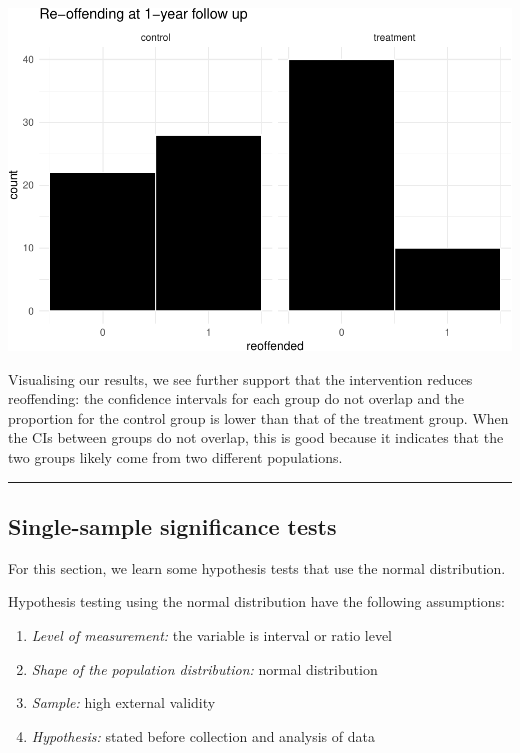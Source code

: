 \documentclass[
]{book}
\begin{document}
\includegraphics{06-hypotheses_files/figure-latex/unnamed-chunk-6-1.pdf}

Visualising our results, we see further support that the intervention reduces reoffending: the confidence intervals for each group do not overlap and the proportion for the control group is lower than that of the treatment group. When the CIs between groups do not overlap, this is good because it indicates that the two groups likely come from two different populations.

\begin{center}\rule{0.5\linewidth}{0.5pt}\end{center}

\hypertarget{single-sample-significance-tests}{%
\subsection{Single-sample significance tests}\label{single-sample-significance-tests}}

For this section, we learn some hypothesis tests that use the normal distribution.

Hypothesis testing using the normal distribution have the following assumptions:

\begin{enumerate}
\def\labelenumi{\arabic{enumi}.}
\item
  \emph{Level of measurement:} the variable is interval or ratio level
\item
  \emph{Shape of the population distribution:} normal distribution
\item
  \emph{Sample:} high external validity
\item
  \emph{Hypothesis:} stated before collection and analysis of data
\end{enumerate}
\end{document}
